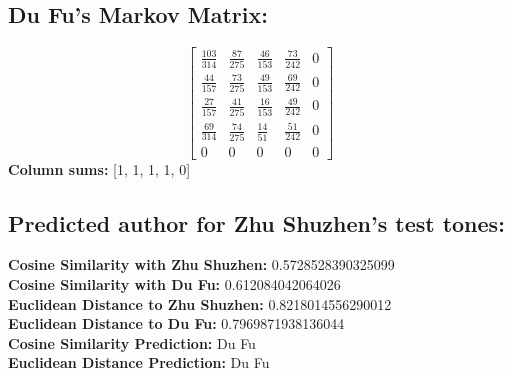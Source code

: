 \documentclass[12pt]{article}
\begin{document}
\subsection*{Du Fu's Markov Matrix:}
\[
\begin{bmatrix}
    \frac{103}{314} & \frac{87}{275} & \frac{46}{153} & \frac{73}{242} & 0 \\
    \frac{44}{157} & \frac{73}{275} & \frac{49}{153} & \frac{69}{242} & 0 \\
    \frac{27}{157} & \frac{41}{275} & \frac{16}{153} & \frac{49}{242} & 0 \\
    \frac{69}{314} & \frac{74}{275} & \frac{14}{51} & \frac{51}{242} & 0 \\
    0 & 0 & 0 & 0 & 0
\end{bmatrix}
\]
\textbf{Column sums:} [1, 1, 1, 1, 0]

\subsection*{Predicted author for Zhu Shuzhen's test tones:}
\textbf{Cosine Similarity with Zhu Shuzhen:} 0.5728528390325099
\\
\textbf{Cosine Similarity with Du Fu:} 0.612084042064026
\\
\textbf{Euclidean Distance to Zhu Shuzhen:} 0.8218014556290012
\\
\textbf{Euclidean Distance to Du Fu:} 0.7969871938136044
\\
\textbf{Cosine Similarity Prediction:} Du Fu
\\
\textbf{Euclidean Distance Prediction:} Du Fu
\end{document}
